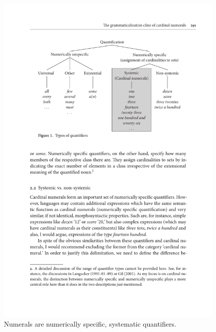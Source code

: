 \documentclass{../src/bcthesispart}
\begin{document}
\begin{figure}
	\includegraphics{../figures/CH5-quantifiers}
	\caption{Numerals are numerically specific, systematic quantifiers.
	\label{fig:ch5:quantifiers}}
\end{figure}
\end{document}
